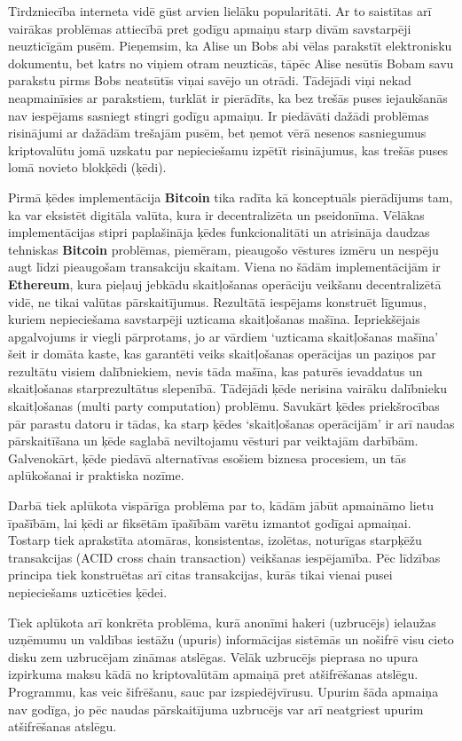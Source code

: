 Tirdzniecība interneta vidē gūst arvien lielāku popularitāti. 
Ar to saistītas arī vairākas problēmas attiecībā pret godīgu apmaiņu starp divām savstarpēji neuzticīgām pusēm. 
Pieņemsim, ka Alise un Bobs abi vēlas parakstīt elektronisku dokumentu, bet katrs no viņiem otram neuzticās, tāpēc Alise nesūtīs Bobam savu parakstu pirms Bobs neatsūtīs viņai savējo un otrādi. 
Tādējādi viņi nekad neapmainīsies ar parakstiem, turklāt ir pierādīts, ka bez trešās puses iejaukšanās nav iespējams sasniegt stingri godīgu apmaiņu.\cite{pagnia99}
Ir piedāvāti dažādi problēmas risinājumi ar dažādām trešajām pusēm, bet ņemot vērā nesenos sasniegumus kriptovalūtu jomā uzskatu par nepieciešamu izpētīt risinājumus, kas trešās puses lomā novieto blokķēdi (ķēdi). 


Pirmā ķēdes implementācija \textbf{Bitcoin} tika radīta kā konceptuāls pierādījums tam, ka var eksistēt digitāla valūta, kura ir decentralizēta un pseidonīma. 
Vēlākas implementācijas stipri paplašināja ķēdes funkcionalitāti un atrisināja daudzas tehniskas \textbf{Bitcoin} problēmas, piemēram, pieaugošo vēstures izmēru un nespēju augt līdzi pieaugošam transakciju skaitam.%
Viena no šādām implementācijām ir \textbf{Ethereum}, kura pieļauj jebkādu skaitļošanas operāciju veikšanu decentralizētā vidē, ne tikai valūtas pārskaitījumus.\cite{etherum}
Rezultātā iespējams konstruēt līgumus, kuriem nepieciešama savstarpēji uzticama skaitļošanas mašīna.
Iepriekšējais apgalvojums ir viegli pārprotams, jo ar vārdiem `uzticama skaitļošanas mašīna' šeit ir domāta kaste, kas garantēti veiks skaitļošanas operācijas un paziņos par rezultātu visiem dalībniekiem, nevis tāda mašīna, kas paturēs ievaddatus un skaitļošanas starprezultātus slepenībā.
Tādējādi ķēde nerisina vairāku dalībnieku skaitļošanas (multi party computation) problēmu.
Savukārt ķēdes priekšrocības pār parastu datoru ir tādas, ka starp ķēdes `skaitļošanas operācijām' ir arī naudas pārskaitīšana un ķēde saglabā neviltojamu vēsturi par veiktajām darbībām.
Galvenokārt, ķēde piedāvā alternatīvas esošiem biznesa procesiem, un tās aplūkošanai ir praktiska nozīme.

Darbā tiek aplūkota vispārīga problēma par to, kādām jābūt apmaināmo lietu īpašībām, lai ķēdi ar fiksētām īpašībām varētu izmantot godīgai apmaiņai. Tostarp tiek aprakstīta atomāras, konsistentas, izolētas, noturīgas starpķēžu transakcijas (ACID cross chain transaction) veikšanas iespējamība.\cite{back14,nolan13} 
Pēc līdzības principa tiek konstruētas arī citas transakcijas, kurās tikai vienai pusei nepieciešams uzticēties ķēdei.

Tiek aplūkota arī konkrēta problēma, kurā anonīmi hakeri (uzbrucējs) ielaužas uzņēmumu un valdības iestāžu (upuris) informācijas sistēmās un nošifrē visu cieto disku zem uzbrucējam zināmas atslēgas. 
Vēlāk uzbrucējs pieprasa no upura izpirkuma maksu kādā no kriptovalūtām apmaiņā pret atšifrēšanas atslēgu. Programmu, kas veic šifrēšanu, sauc par izspiedējvīrusu.
Upurim šāda apmaiņa nav godīga, jo pēc naudas pārskaitījuma uzbrucējs var arī neatgriest upurim atšifrēšanas atslēgu. %

